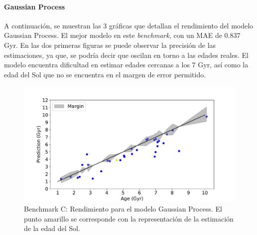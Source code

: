 \begin{table}[H]
\centering
{}%
\caption{Edad estimada para el Sol en Gyr. El método más preciso es rf. }\label{table:sun_results}
\end{table}
\paragraph{Gaussian Process} 
A continuación, se muestran las 3 gráficas que detallan el rendimiento del modelo Gaussian Process. El mejor modelo en este \emph{benchmark}, con un MAE de 0.837 Gyr. En las dos primeras figuras se puede observar la precisión de las estimaciones, ya que, se podría decir que oscilan en torno a las edades reales. El modelo encuentra dificultad en estimar edades cercanas a los 7 Gyr, así como la edad del Sol que no se encuentra en el margen de error permitido.

\begin{figure}[H]
\begin{center}
 \includegraphics[width=0.8\linewidth]{Figuras/Experimentos/B_C_gp_1.pdf}
\end{center}
\caption{Benchmark C: Rendimiento para el modelo Gaussian Process. El punto amarillo se corresponde con la representación de la estimación de la edad del Sol.}
 \label{fig:benchC_best_1}
\end{figure}

